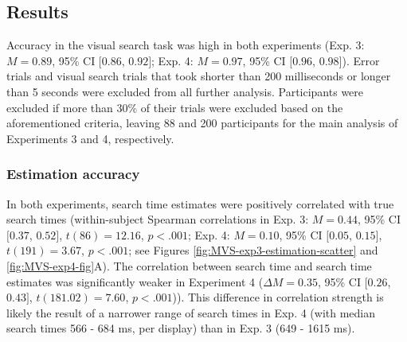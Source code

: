 \documentclass[12pt,twoside]{reedthesis}
\begin{document}
\hypertarget{results-3}{%
\subsection{Results}\label{results-3}}

Accuracy in the visual search task was high in both experiments (Exp. 3: \(M = 0.89\), 95\% CI \([0.86\), \(0.92]\); Exp. 4: \(M = 0.97\), 95\% CI \([0.96\), \(0.98]\)).
Error trials and visual search trials that took shorter than 200 milliseconds or longer than 5 seconds were excluded from all further analysis. Participants were excluded if more than 30\% of their trials were excluded based on the aforementioned criteria, leaving 88 and 200 participants for the main analysis of Experiments 3 and 4, respectively.

\hypertarget{estimation-accuracy-1}{%
\subsubsection*{Estimation accuracy}\label{estimation-accuracy-1}}

In both experiments, search time estimates were positively correlated with true search times (within-subject Spearman correlations in Exp. 3: \(M = 0.44\), 95\% CI \([0.37\), \(0.52]\), \(t(86) = 12.16\), \(p < .001\); Exp. 4: \(M = 0.10\), 95\% CI \([0.05\), \(0.15]\), \(t(191) = 3.67\), \(p < .001\); see Figures \ref{fig:MVS-exp3-estimation-scatter} and \ref{fig:MVS-exp4-fig}A). The correlation between search time and search time estimates was significantly weaker in Experiment 4 (\(\Delta M = 0.35\), 95\% CI \([0.26\), \(0.43]\), \(t(181.02) = 7.60\), \(p < .001\))). This difference in correlation strength is likely the result of a narrower range of search times in Exp. 4 (with median search times 566 - 684 ms, per display) than in Exp. 3 (649 - 1615 ms).
\end{document}
